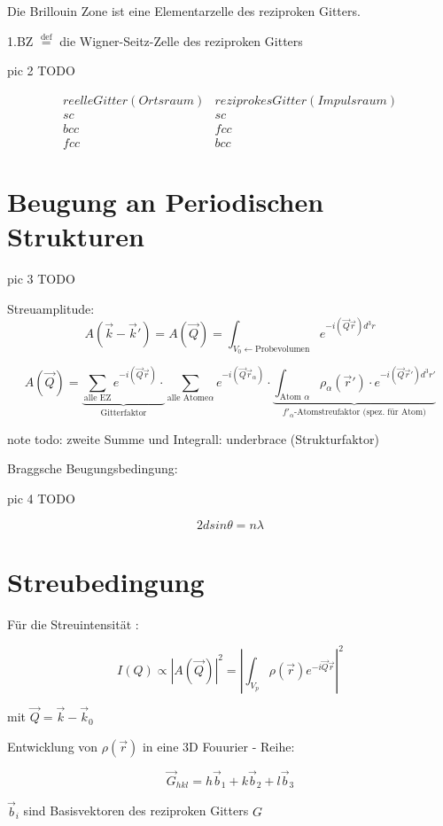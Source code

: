 Die Brillouin Zone ist eine Elementarzelle des reziproken Gitters. 

1.BZ \(\stackrel{\mathrm{def}}=\) die Wigner-Seitz-Zelle des reziproken Gitters

pic 2 TODO 

\[
\begin{array}{cc} reelle Gitter (Ortsraum)&reziprokes Gitter (Impulsraum)\\
sc&sc\\
bcc&fcc\\
fcc&bcc
\end{array}
\]



\section{Beugung an Periodischen Strukturen}

pic 3 TODO

Streuamplitude: 
\[A(\vec k -\vec k')=A(\vec Q)=\int_{V_0\leftarrow\text{Probevolumen}}e^{-i(\vec  Q\vec r) d^3r}\]

\[ A(\vec Q) = \underbrace{\sum_{\text{alle EZ}}e^{-i(\vec  Q\vec r)}\cdot}_{\text{Gitterfaktor}} \sum_{\text{alle
    Atome}\alpha}e^{-i(\vec  Q\vec r_\alpha)}\cdot \underbrace{\int_{\text{Atom }\alpha}
\rho_\alpha(\vec r')\cdot e^{-i(\vec  Q\vec
  r')d^3r'}}_{f'_\alpha\text{-Atomstreufaktor (spez. für Atom)}}\]



note todo: zweite Summe und Integrall: underbrace (Strukturfaktor)

Braggsche Beugungsbedingung:

pic 4 TODO

\[ 2dsin\theta=n\lambda\]


\section{Streubedingung}

Für die Streuintensität :

 \[I(Q) \propto | A(\vec
Q)|^2=|\int_{V_p}\rho(\vec r) e^{-i\vec Q\vec r}|^2\]

mit \(\vec Q = \vec k - \vec k_0\)

Entwicklung von \(\rho(\vec r)\) in eine 3D Fouurier - Reihe:

\[ \vec G_{hkl} = h\vec b_1+ k\vec b_2+ l\vec b_3 \]

\(\vec b_i\) sind Basisvektoren des reziproken Gitters \(G\)

